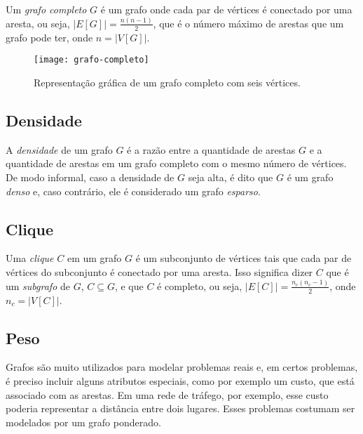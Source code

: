 Um \emph{grafo completo} $G$ é um grafo onde cada par de vértices é conectado por uma aresta, ou seja, $|E[G]| = \frac{n(n-1)}{2}$, que é o número máximo de arestas que um grafo pode ter, onde $n = |V[G]|$.

\begin{figure}[h]
\texttt{[image: grafo-completo]}
\centering
\caption{Representação gráfica de um grafo completo com seis vértices.}
\end{figure}

\subsection{Densidade}
\label{conceitos__grafo--densidade}

A \emph{densidade} de um grafo $G$ é a razão entre a quantidade de arestas $G$ e a quantidade de arestas em um grafo completo com o mesmo número de vértices. De modo informal, caso a densidade de $G$ seja alta, é dito que $G$ é um grafo \emph{denso} e, caso contrário, ele é considerado um grafo \emph{esparso}.

\subsection{Clique}
\label{conceitos__grafo--clique}

Uma \emph{clique} $C$ em um grafo $G$ é um subconjunto de vértices tais que cada par de vértices do subconjunto é conectado por uma aresta. Isso significa dizer $C$ que é um \emph{subgrafo} de $G$, $C \subseteq G$, e que $C$ é completo, ou seja, $|E[C]| = \frac{n_{c}(n_{c}-1)}{2}$, onde $n_{c} = |V[C]|$.


\subsection{Peso}
\label{conceitos__grafo--peso}

Grafos são muito utilizados para modelar problemas reais e, em certos problemas, é preciso incluir alguns atributos especiais, como por exemplo um custo, que está associado com as arestas. Em uma rede de tráfego, por exemplo, esse custo poderia representar a distância entre dois lugares. Esses problemas costumam ser modelados por um grafo ponderado.

